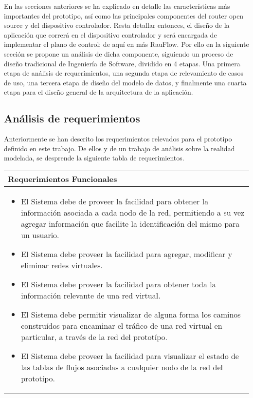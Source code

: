 En las secciones anteriores se ha explicado en detalle las caracter\'isticas m\'as importantes del prototipo, as\'i como las principales componentes del router open source y del dispositivo controlador. 
Resta detallar entonces, el dise\~no de la aplicaci\'on que correr\'a en el dispositivo controlador y ser\'a encargada de implementar el plano de control; de aqu\'i en m\'as RauFlow. Por ello en la siguiente secci\'on se propone un an\'alisis de dicha componente, siguiendo un proceso de dise\~no tradicional de Ingenier\'ia de Software, dividido en 4 etapas. Una primera etapa de an\'alisis de requerimientos, una segunda etapa de relevamiento de casos de uso, una tercera etapa de dise\~no del modelo de datos, y finalmente una cuarta etapa para el dise\~no general de la arquitectura de la aplicaci\'on.  

\subsection[An\'alisi de requerimientos]{An\'alisis de requerimientos}

Anteriormente se han descrito los requerimientos relevados para el prototipo definido en este trabajo. De ellos y de un trabajo de an\'alisis sobre la realidad modelada, se desprende la siguiente tabla de requerimientos.

\clearpage
\begin{table}[Htl]\centering
\begin{tabularx}{\textwidth}{|>{\setlength\hsize{1.0\hsize}\setlength\linewidth{\hsize}}X|}
\hline
Requerimientos Funcionales\\ \hline
\hline
\begin{itemize}
\item El Sistema debe de proveer la facilidad para obtener la informaci\'on asociada a cada nodo de la red, permitiendo a su vez agregar informaci\'on que facilite la identificaci\'on del mismo para un usuario.
\item El Sistema debe proveer la facilidad para agregar, modificar y eliminar redes virtuales. 
\item El Sistema debe proveer la facilidad para obtener toda la informaci\'on relevante de una red virtual.
\item El Sistema debe permitir visualizar de alguna forma los caminos constru\'idos para encaminar el tr\'afico de una red virtual en particular, a trav\'es de la red del protot\'ipo.
\item El Sistema debe proveer la facilidad para visualizar el estado de las tablas de flujos asociadas a cualquier nodo de la red del protot\'ipo.
\end{itemize}\\
\hline
\end{tabularx}
\end{table}

